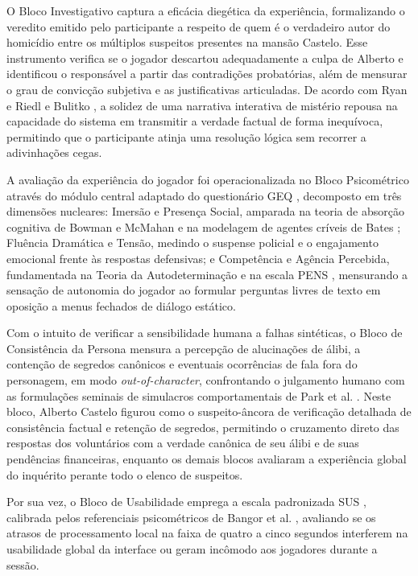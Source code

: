 O Bloco Investigativo captura a eficácia diegética da experiência, formalizando o veredito emitido pelo participante a respeito de quem é o verdadeiro autor do homicídio entre os múltiplos suspeitos presentes na mansão Castelo. Esse instrumento verifica se o jogador descartou adequadamente a culpa de Alberto e identificou o responsável a partir das contradições probatórias, além de mensurar o grau de convicção subjetiva e as justificativas articuladas. De acordo com Ryan \cite{ryan2006interactive} e Riedl e Bulitko \cite{riedl2013interactive}, a solidez de uma narrativa interativa de mistério repousa na capacidade do sistema em transmitir a verdade factual de forma inequívoca, permitindo que o participante atinja uma resolução lógica sem recorrer a adivinhações cegas.

A avaliação da experiência do jogador foi operacionalizada no Bloco Psicométrico através do módulo central adaptado do questionário GEQ \cite{ijsselsteijn2013game}, decomposto em três dimensões nucleares: Imersão e Presença Social, amparada na teoria de absorção cognitiva de Bowman e McMahan \cite{bowman2007virtual} e na modelagem de agentes críveis de Bates \cite{bates1994role}; Fluência Dramática e Tensão, medindo o suspense policial e o engajamento emocional frente às respostas defensivas; e Competência e Agência Percebida, fundamentada na Teoria da Autodeterminação e na escala PENS \cite{ryan2006motivational}, mensurando a sensação de autonomia do jogador ao formular perguntas livres de texto em oposição a menus fechados de diálogo estático.

Com o intuito de verificar a sensibilidade humana a falhas sintéticas, o Bloco de Consistência da Persona mensura a percepção de alucinações de álibi, a contenção de segredos canônicos e eventuais ocorrências de fala fora do personagem, em modo \textit{out-of-character}, confrontando o julgamento humano com as formulações seminais de simulacros comportamentais de Park et al. \cite{park2023generative}. Neste bloco, Alberto Castelo figurou como o suspeito-âncora de verificação detalhada de consistência factual e retenção de segredos, permitindo o cruzamento direto das respostas dos voluntários com a verdade canônica de seu álibi e de suas pendências financeiras, enquanto os demais blocos avaliaram a experiência global do inquérito perante todo o elenco de suspeitos.

Por sua vez, o Bloco de Usabilidade emprega a escala padronizada SUS \cite{brooke1996sus}, calibrada pelos referenciais psicométricos de Bangor et al. \cite{bangor2008empirical}, avaliando se os atrasos de processamento local na faixa de quatro a cinco segundos interferem na usabilidade global da interface ou geram incômodo aos jogadores durante a sessão.

